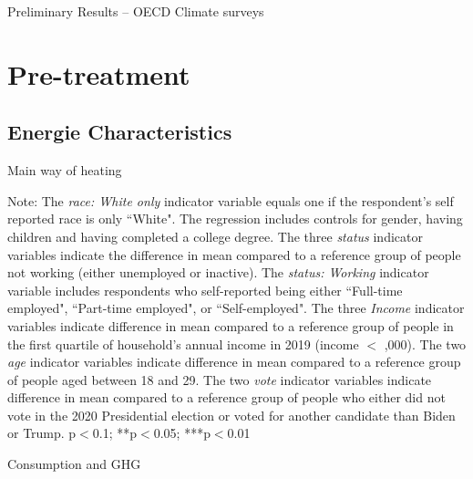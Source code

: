 \documentclass{article}
\begin{document}
\begin{LARGE}
	\begin{center}
		Preliminary Results – OECD Climate surveys	
	\end{center}
	
\end{LARGE}
	\tableofcontents
	\listoftables

\clearpage

\section{Pre-treatment}

\subsection{Energie Characteristics}

\begin{table}[h!]
	\caption{Main way of heating} \label{table heating}
	\begin{center}
		\scalebox{0.7}{}
	\end{center}
	{\footnotesize Note: The \textit{race: White only} indicator variable equals one if the respondent's self reported race is only ``White". The regression includes controls for gender, having children and having completed a college degree. The three \textit{status} indicator variables indicate the difference in mean compared to a reference group of people not working (either unemployed or inactive). The \textit{status: Working} indicator variable includes respondents who self-reported being either ``Full-time employed", ``Part-time employed", or ``Self-employed". The three \textit{Income} indicator variables indicate difference in mean compared to a reference group of people in the first quartile of household's annual income in 2019 (income $<$ ,000). The two \textit{age} indicator variables indicate difference in mean compared to a reference group of people aged between 18 and 29. The two \textit{vote} indicator variables indicate difference in mean compared to a reference group of people who either did not vote in the 2020 Presidential election or voted for another candidate than Biden or Trump.
	\newline  *p$<$0.1; **p$<$0.05; ***p$<$0.01}
\end{table}	

\begin{table}[h!]
	\caption{Consumption and GHG}
	\begin{center}
		\scalebox{0.7}{}
	\end{center}
\end{table}	
\end{document}
